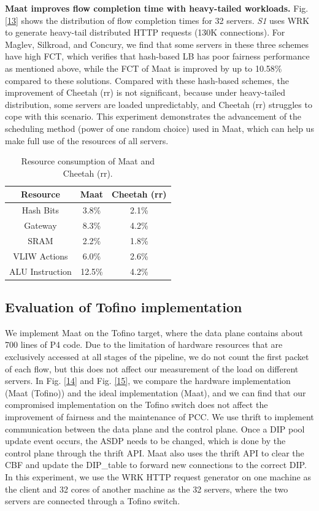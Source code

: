 \textbf{Maat improves flow completion time with heavy-tailed workloads.} Fig. \ref{13} shows the distribution of flow completion times for 32 servers. \emph{S1} uses WRK to generate heavy-tail distributed HTTP requests (130K connections). For Maglev, Silkroad, and Concury, we find that some servers in these three schemes have high FCT, which verifies that hash-based LB has poor fairness performance as mentioned above, while the FCT of Maat is improved by up to 10.58\% compared to these solutions. Compared with these hash-based schemes, the improvement of Cheetah (rr) is not significant, because under heavy-tailed distribution, some servers are loaded unpredictably, and Cheetah (rr) struggles to cope with this scenario. This experiment demonstrates the advancement of the scheduling method (power of one random choice) used in Maat, which can help us make full use of the resources of all servers.

\begin{table}[tbp]
	\centering
	\caption{Resource consumption of Maat and Cheetah (rr).}
	\begin{tabular}{|c|c|c|} %
		\hline 
		Resource&Maat&Cheetah (rr)\\
		\hline  
		Hash Bits&3.8\%&2.1\%\\
		\hline
		Gateway &8.3\%&4.2\%\\
		\hline
		SRAM &2.2\%&1.8\%\\
		\hline
		VLIW Actions&6.0\%&2.6\%\\
		\hline
		ALU Instruction&12.5\%&4.2\%\\
		\hline
	\end{tabular}
	\label{1}
	\vspace{-1em}
\end{table}

\subsection{Evaluation of Tofino implementation}
We implement Maat on the Tofino target, where the data plane contains about 700 lines of P4 code. Due to the limitation of hardware resources that are exclusively accessed at all stages of the pipeline, we do not count the first packet of each flow, but this does not affect our measurement of the load on different servers. In Fig. \ref{14} and Fig. \ref{15}, we compare the hardware implementation (Maat (Tofino)) and the ideal implementation (Maat), and we can find that our compromised implementation on the Tofino switch does not affect the improvement of fairness and the maintenance of PCC. We use thrift to implement communication between the data plane and the control plane. Once a DIP pool update event occurs, the ASDP needs to be changed, which is done by the control plane through the thrift API. Maat also uses the thrift API to clear the CBF and update the DIP_table to forward new connections to the correct DIP. In this experiment, we use the WRK HTTP request generator on one machine as the client and 32 cores of another machine as the 32 servers, where the two servers are connected through a Tofino switch.

